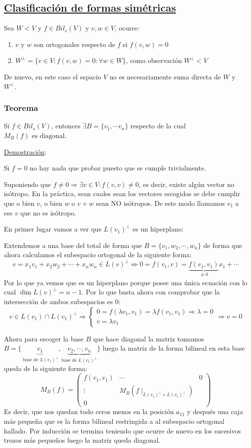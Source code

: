 \documentclass[10pt,a4paper,openright]{book}
\begin{document}
\subsection*{\underline{Clasificación de formas simétricas}}
Sea $W<V$ y $f\in Bil_s(V)$ y $v,w\in V$, ocurre:
\begin{enumerate}
\item $v$ y $w$ son ortogonales respecto de $f$ si $f(v,w)=0$
\item $W^\perp=\{v\in V: f(v,w)=0: \forall w\in W\}$, como observación $W^\perp< V$
\end{enumerate}
De nuevo, en este caso el espacio $V$ no es necesariamente suma directa de $W$ y $W^\perp$.
\subsubsection*{Teorema}
Si $f\in Bil_s(V)$, entonces $\exists B=\{v_1, \cdots v_n\}$ respecto de la cual  $M_B(f) \mbox{ es diagonal}$.

\underline{Demostración}:

Si $f = 0$ no hay nada que probar puesto que se cumple trivialmente.

Suponiendo que $f\neq 0\Rightarrow \exists v\in V: f(v,v)\neq 0$, es decir, existe algún vector no isótropo. En la práctica, sean cuales sean los vectores escogidos se debe cumplir que o bien $v$, o bien $w$ o $v+w$ sean NO isótropos. De este modo llamamos $v_1$ a ese $v$ que no es isótropo.

En primer lugar vamos a ver que $L(v_1)^\perp$ es un hiperplano:

Extendemos a una base del total de forma que $B=\{v_1, w_2, \cdots , w_n\}$ de forma que ahora calculamos el subespacio ortogonal de la siguiente forma:
$$v= x_1v_1+x_2w_2+\cdots +x_nw_n\in L(v)^\perp \Leftrightarrow 0 = f(v_1,v)=\underbrace{f(v_1,v_1)}_{\neq 0}x_1+\cdots $$
Por lo que ya vemos que es un hiperplano porque posee una única ecuación con lo cual $\dim L(v)^\perp = n-1$. Por lo que basta ahora con comprobar que la intersección de ambos subespacios es 0:
$$v\in L(v_1)\cap L(v_1)^\perp \Rightarrow \begin{cases} 0 = f(\lambda v_1, v_1)= \lambda f(v_1,v_1)\Rightarrow \lambda = 0 \\ v = \lambda v_1\end{cases}\Rightarrow v = 0$$

Ahora para escoger la base $B$ que hace diagonal la matriz tomamos $B=\{\underbrace{v_1}_{\mbox{ base de }L(v_1)^\perp},\underbrace{ v_2, \cdots , v_n}_{\mbox{base de }L(v_1)^\perp}\}$ luego la matriz de la forma bilineal en esta base queda de la siguiente forma:
$$M_B(f)=\begin{pmatrix} f(v_1,v_1)&\cdots & 0 \\ \vdots & M_B(f\mid_{L(v_1)^\perp \times L(v_1)^\perp}) \\ 0 \end{pmatrix}$$
Es decir, que nos quedan todo ceros menos en la posición $a_{11}$ y después una caja más pequeña que es la forma bilineal restringida a al subespacio ortogonal hallado. Por inducción se termina teniendo que ocurre de nuevo en los sucesivos trozos más pequeños luego la matriz queda diagonal.
\end{document}
